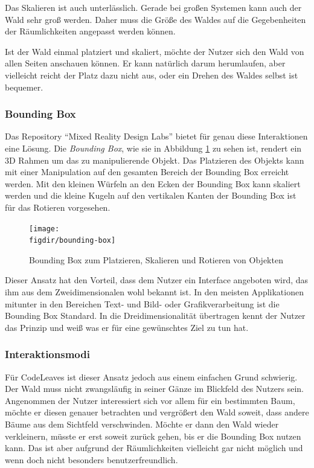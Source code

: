 Das Skalieren ist auch unterlässlich. Gerade bei großen Systemen kann auch der Wald sehr groß werden. Daher muss die Größe des Waldes auf die Gegebenheiten der Räumlichkeiten angepasst werden können.

Ist der Wald einmal platziert und skaliert, möchte der Nutzer sich den Wald von allen Seiten anschauen können. Er kann natürlich darum herumlaufen, aber vielleicht reicht der Platz dazu nicht aus, oder ein Drehen des Waldes selbst ist bequemer.

\subsubsection*{Bounding Box}

Das Repository "`Mixed Reality Design Labs"' bietet für genau diese Interaktionen eine Lösung. Die \textit{Bounding Box}, wie sie in Abbildung \ref{fig:bounding-box} zu sehen ist, rendert ein 3D Rahmen um das zu manipulierende Objekt. Das Platzieren des Objekts kann mit einer Manipulation auf den gesamten Bereich der Bounding Box erreicht werden. Mit den kleinen Würfeln an den Ecken der Bounding Box kann skaliert werden und die kleine Kugeln auf den vertikalen Kanten der Bounding Box ist für das Rotieren vorgesehen.

\begin{figure}[htb]
  \texttt{[image: \\figdir/bounding-box]}
  \caption{Bounding Box zum Platzieren, Skalieren und Rotieren von Objekten \cite{microsoft2017mixed}}
  \label{fig:bounding-box}
\end{figure}

Dieser Ansatz hat den Vorteil, dass dem Nutzer ein Interface angeboten wird, das ihm aus dem Zweidimensionalen wohl bekannt ist. In den meisten Applikationen mitunter in den Bereichen Text- und Bild- oder Grafikverarbeitung ist die Bounding Box Standard. In die Dreidimensionalität übertragen kennt der Nutzer das Prinzip und weiß was er für eine gewünschtes Ziel zu tun hat.

\subsubsection*{Interaktionsmodi}

Für CodeLeaves ist dieser Ansatz jedoch aus einem einfachen Grund schwierig. Der Wald muss nicht zwangsläufig in seiner Gänze im Blickfeld des Nutzers sein. Angenommen der Nutzer interessiert sich vor allem für ein bestimmten Baum, möchte er diesen genauer betrachten und vergrößert den Wald soweit, dass andere Bäume aus dem Sichtfeld verschwinden. Möchte er dann den Wald wieder verkleinern, müsste er erst soweit zurück gehen, bis er die Bounding Box nutzen kann. Das ist aber aufgrund der Räumlichkeiten vielleicht gar nicht möglich und wenn doch nicht besonders benutzerfreundlich.

